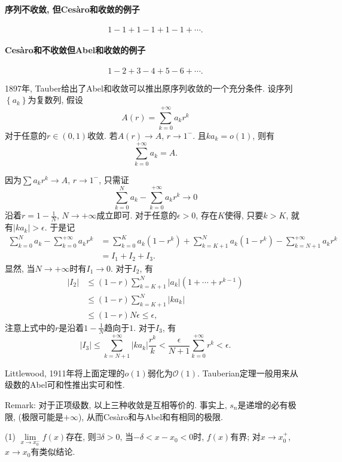 \paragraph{序列不收敛, 但Ces\`{a}ro和收敛的例子}

\[
1-1+1-1+1-1+\cdots.
\]

\paragraph{Ces\`{a}ro和不收敛但Abel和收敛的例子}

\[
1-2+3-4+5-6+\cdots.
\]

1897年, Tauber给出了Abel和收敛可以推出原序列收敛的一个充分条件. 
设序列$\left\{ a_{k}\right\} $为复数列, 假设
\[
A(r)=\sum_{k=0}^{+\infty}a_{k}r^{k}
\]
对于任意的$r\in(0,1)$收敛. 若$A(r)\to A$, $r\to1^{-}$. 且$ka_{k}=o(1)$,
则有
\[
\sum_{k=0}^{+\infty}a_{k}=A.
\]
\et

\ba
因为$\sum a_{k}r^{k}\to A$, $r\to1^{-}$, 只需证
\[
\sum_{k=0}^{N}a_{k}-\sum_{k=0}^{+\infty}a_{k}r^{k}\rightarrow0
\]
沿着$r=1-\frac{1}{N}$, $N\to+\infty$成立即可. 对于任意的$\epsilon>0$, 存在$K$使得,
只要$k>K$, 就有$\left|ka_{k}\right|>\epsilon$. 于是记
\[
\begin{aligned}\sum_{k=0}^{N}a_{k}-\sum_{k=0}^{+\infty}a_{k}r^{k} & =\sum_{k=0}^{K}a_{k}\left(1-r^{k}\right)+\sum_{k=K+1}^{N}a_{k}\left(1-r^{k}\right)-\sum_{k=N+1}^{+\infty}a_{k}r^{k}\\
& =I_{1}+I_{2}+I_{3}.
\end{aligned}
\]
显然, 当$N\to+\infty$时有$I_{1}\to0$. 对于$I_{2}$, 有
\[
\begin{aligned}\left|I_{2}\right| & \leq(1-r)\sum_{k=K+1}^{N}\left|a_{k}\right|\left(1+\cdots+r^{k-1}\right)\\
& \leq(1-r)\sum_{k=K+1}^{N}\left|ka_{k}\right|\\
& \leq(1-r)N\epsilon\leq\epsilon,
\end{aligned}
\]
注意上式中的$r$是沿着$1-\frac{1}{N}$趋向于$1$. 对于$I_{3}$, 有
\[
\left|I_{3}\right|\leq\sum_{k=N+1}^{+\infty}\left|ka_{k}\right|\frac{r^{k}}{k}<\frac{\epsilon}{N+1}\sum_{k=0}^{+\infty}r^{k}<\epsilon.
\]
\ea

Littlewood, 1911年将上面定理的$o(1)$弱化为$\mathcal{O}(1)$. Tauberian定理一般用来从级数的Abel可和性推出实可和性.

Remark: 对于正项级数, 以上三种收敛是互相等价的. 事实上, $s_{n}$是递增的必有极限, (极限可能是$+\infty$),
从而Ces\`{a}ro和与Abel和有相同的极限.

(1) $\lim\limits_{x\to x_0^{-}}f(x)$存在, 则$\exists\delta>0$, 当$-\delta<x-x_0<0$时, $f(x)$有界; 对$x\to x_0^+$, $x\to x_0$有类似结论.

